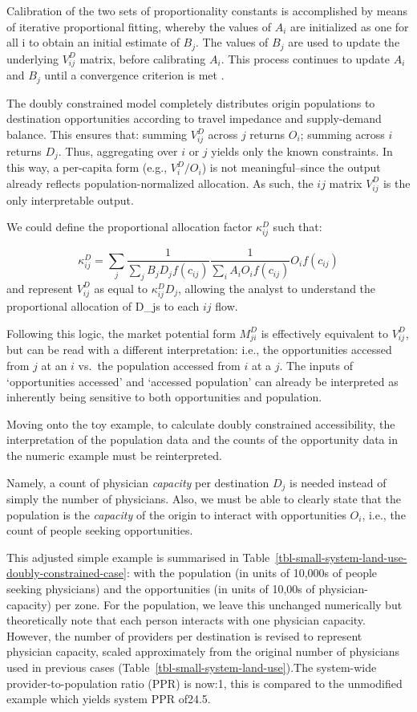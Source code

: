 \documentclass[
  10pt,
  letterpaper,
]{article}
\begin{document}
Calibration of the two sets of proportionality constants is accomplished
by means of iterative proportional fitting, whereby the values of
\(A_i\) are initialized as one for all i to obtain an initial estimate
of \(B_j\). The values of \(B_j\) are used to update the underlying
\(V_{ij}^D\) matrix, before calibrating \(A_i\). This process continues
to update \(A_i\) and \(B_j\) until a convergence criterion is met
\citep[see][p.~193-195]{ortuzar_2011_modelling}.

The doubly constrained model completely distributes origin populations
to destination opportunities according to travel impedance and
supply-demand balance. This ensures that: summing \(V^D_{ij}\) across
\(j\) returns \(O_i\); summing across \(i\) returns \(D_j\). Thus,
aggregating over \(i\) or \(j\) yields only the known constraints. In
this way, a per-capita form (e.g., \(V^D_i / O_i\)) is not
meaningful--since the output already reflects population-normalized
allocation. As such, the \(ij\) matrix \(V^D_{ij}\) is the only
interpretable output.

We could define the proportional allocation factor \(\kappa_{ij}^D\)
such that:

\[
\kappa_{ij}^D = \sum_j \frac{1}{\sum_j B_j D_j f(c_{ij})} \frac{1}{\sum_i A_i O_i f(c_{ij})} O_i f(c_{ij})
\] \noindent and represent \(V^D_{ij}\) as equal to
\(\kappa^D_{ij} D_j\), allowing the analyst to understand the
proportional allocation of D\_js to each \(ij\) flow.

Following this logic, the market potential form \(M^D_{ji}\) is
effectively equivalent to \(V_{ij}^D\), but can be read with a different
interpretation: i.e., the opportunities accessed from \(j\) at an \(i\)
vs.~the population accessed from \(i\) at a \(j\). The inputs of
`opportunities accessed' and `accessed population' can already be
interpreted as inherently being sensitive to both opportunities and
population.

Moving onto the toy example, to calculate doubly constrained
accessibility, the interpretation of the population data and the counts
of the opportunity data in the numeric example must be reinterpreted.

Namely, a count of physician \emph{capacity} per destination \(D_j\) is
needed instead of simply the number of physicians. Also, we must be able
to clearly state that the population is the \emph{capacity} of the
origin to interact with opportunities \(O_i\), i.e., the count of people
seeking opportunities.

This adjusted simple example is summarised in
Table~\ref{tbl-small-system-land-use-doubly-constrained-case}: with the
population (in units of 10,000s of people seeking physicians) and the
opportunities (in units of 10,00s of physician-capacity) per zone. For
the population, we leave this unchanged numerically but theoretically
note that each person interacts with one physician capacity. However,
the number of providers per destination is revised to represent
physician capacity, scaled approximately from the original number of
physicians used in previous cases
(Table~\ref{tbl-small-system-land-use}).The system-wide
provider-to-population ratio (PPR) is now:1, this is compared to the
unmodified example which yields system PPR of24.5.
\end{document}
